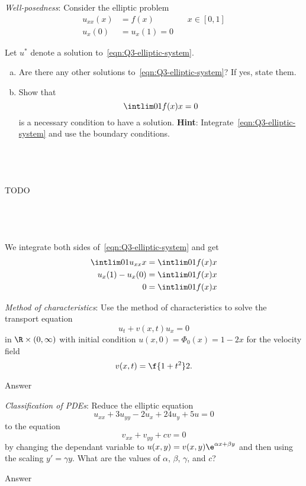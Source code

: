 \documentclass[a4paper]{article}
\begin{document}


\begin{questionbody}
\textit{Well-posedness}: Consider the elliptic problem \begin{align*}
u_{xx}(x) &= f(x) \qquad\qquad x \in [0, 1] \tag{\dagger}\label{eqn:Q3-elliptic-system} \\
u_x(0) &= u_x(1) = 0
\end{align*}

Let $u^*$ denote a solution to~\eqref{eqn:Q3-elliptic-system}.
\begin{enumerate}[(a)]
\item Are there any other solutions to~\eqref{eqn:Q3-elliptic-system}? If yes, state them.
\item Show that \[ \intlim 0 1 {f(x)} x = 0 \] is a necessary condition to have a solution. \textbf{Hint}: Integrate~\eqref{eqn:Q3-elliptic-system} and use the boundary conditions.
\end{enumerate}
\end{questionbody}

\subsection{~} %

TODO

\subsection{~} %

We integrate both sides of~\eqref{eqn:Q3-elliptic-system} and get \begin{align*}
\intlim 01 {u_{xx}} x &= \intlim 01 {f(x)} x \\
u_x(1) - u_x(0) &= \intlim 01 {f(x)} x \\
0 &= \intlim 01 {f(x)} x
\end{align*}



\begin{questionbody}
\textit{Method of characteristics}: Use the method of characteristics to solve the transport equation \[
u_t + v(x, t) u_x = 0
\] in $\R \times (0, \infty)$ with initial condition $u(x, 0) = \Phi_0(x) = 1 - 2x$ for the velocity field \[
v(x, t) = \f{1 + t^2}2.
\]
\end{questionbody}

Answer



\begin{questionbody}
\textit{Classification of PDEs}: Reduce the elliptic equation \[
u_{xx} + 3 u_{yy} - 2 u_x + 24 u_y + 5u = 0
\] to the equation \[
v_{xx} + v_{yy} + cv = 0
\] by changing the dependant variable to $u(x, y) = v(x, y) \e^{\alpha x + \beta y}$ and then using the scaling $y' = \gamma y$. What are the values of $\alpha$, $\beta$, $\gamma$, and $c$?
\end{questionbody}

Answer

\end{document}
